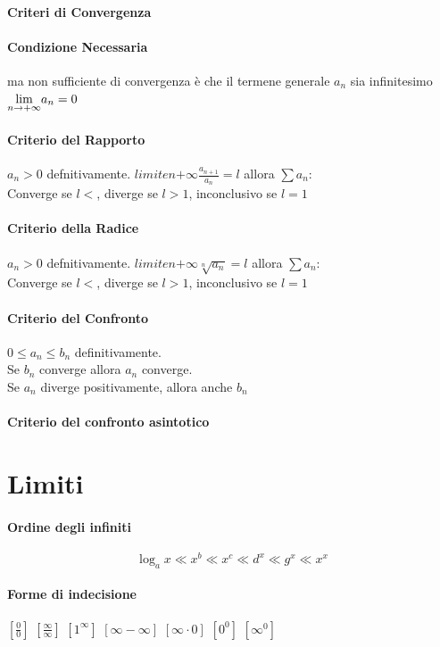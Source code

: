 \documentclass[12pt, a4paper, openany]{book}
\begin{document}
\paragraph*{Criteri di Convergenza}
\paragraph*{Condizione Necessaria} ma non sufficiente di convergenza è che il termene generale $a_n$ sia infinitesimo $\underset{n \to +\infty}{\lim} a_n = 0$

\paragraph*{Criterio del Rapporto}
$a_n>0$ defnitivamente. $limite{n}{+\infty} \frac{a_{n+1}}{a_n}=l$ allora $\sum a_n$:
\\Converge se $l<$, diverge se $l>1$, inconclusivo se $l=1$
\paragraph*{Criterio della Radice}
$a_n>0$ defnitivamente. $limite{n}{+\infty} \sqrt[n]{a_n}=l$ allora $\sum a_n$:
\\Converge se $l<$, diverge se $l>1$, inconclusivo se $l=1$
\paragraph*{Criterio del Confronto}
$0\leq a_n \leq b_n$  definitivamente.
\\Se $b_n$ converge allora $a_n$ converge.
\\Se $a_n$ diverge positivamente, allora anche $b_n$
\paragraph*{Criterio del confronto asintotico} 

\section*{Limiti}
\paragraph*{Ordine degli infiniti}
$$ \log_ax\ll x^b\ll x^c\ll d^x\ll g^x\ll x^x $$

\paragraph*{Forme di indecisione}
	$[\frac{0}{0}]$ $[\frac{\infty}{\infty}]$ $[1^\infty]$ $[\infty - \infty]$ $[\infty \cdot 0]$ $[0^0]$ $[\infty^0]$
\end{document}
